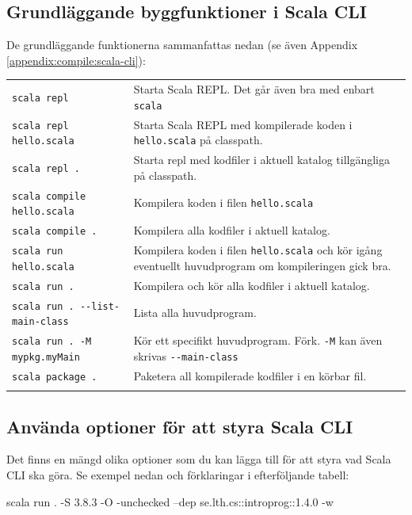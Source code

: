 \subsection{Grundläggande byggfunktioner i Scala CLI}

De grundläggande funktionerna sammanfattas nedan (se även Appendix \ref{appendix:compile:scala-cli}):

\begin{table}[H]
\begin{tabular}{l p{6.5cm}}
\texttt{scala repl} & Starta Scala REPL.  Det går även bra med enbart \texttt{scala}\\
\texttt{scala repl hello.scala} & Starta Scala REPL med kompilerade koden i \texttt{hello.scala} på classpath.  \\
\texttt{scala repl .} & Starta repl med kodfiler i aktuell katalog tillgängliga på classpath. \\
\texttt{scala compile hello.scala} & Kompilera koden i filen \texttt{hello.scala}  \\
\texttt{scala compile .} & Kompilera alla kodfiler i aktuell katalog. \\
\texttt{scala run hello.scala} & Kompilera koden i filen \texttt{hello.scala} och kör igång eventuellt huvudprogram om kompileringen gick bra. \\
\texttt{scala run .} & Kompilera och kör alla kodfiler i aktuell katalog. \\
\texttt{scala run . -{}-list-main-class} & Lista alla huvudprogram. \\
\texttt{scala run . -M mypkg.myMain} & Kör ett specifikt huvudprogram. Förk. \texttt{-M} kan även skrivas \texttt{-{}-main-class}\\
\texttt{scala package .} & Paketera all kompilerade kodfiler i en körbar fil. \\
\\
\end{tabular}
\end{table}

\subsection{Använda optioner för att styra Scala CLI}

\noindent Det finns en mängd olika optioner som du kan lägga till för att styra vad Scala CLI ska göra. Se exempel nedan och förklaringar i efterföljande tabell:
\begin{REPLsmall}
scala run . -S 3.8.3 -O -unchecked --dep se.lth.cs::introprog::1.4.0 -w
\end{REPLsmall}

